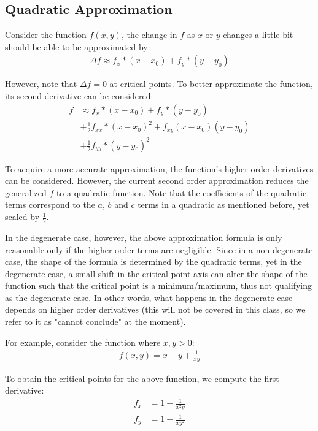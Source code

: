 \documentclass[12pt]{article}
\theoremstyle{definition}
\begin{document}
	\subsection{Quadratic Approximation}
	
	Consider the function $f(x, y)$, the change in $f$ as $x$ or $y$ changes a little bit should be able to be approximated by:
	\begin{gather*}
		\Delta f \approx f_x * (x - x_0) + f_y * (y - y_0)
	\end{gather*}
	
	However, note that $\Delta f = 0$ at critical points. To better approximate the function, its second derivative can be considered:
	\begin{align*}
		f &\approx f_x * (x - x_0) + f_y * (y - y_0) \\
		&+ \frac{1}{2} f_{xx} * (x - x_0)^2 + f_{xy} (x - x_0)(y - y_0) \\
		&+ \frac{1}{2} f_{yy} * (y - y_0)^2
	\end{align*}
	
	To acquire a more accurate approximation, the function's higher order derivatives can be considered. However, the current second order approximation reduces the generalized $f$ to a quadratic function. Note that the coefficients of the quadratic terms correspond to the $a$, $b$ and $c$ terms in a quadratic as mentioned before, yet scaled by $\frac{1}{2}$.
	
	In the degenerate case, however, the above approximation formula is only reasonable only if the higher order terms are negligible. Since in a non-degenerate case, the shape of the formula is determined by the quadratic terms, yet in the degenerate case, a small shift in the critical point axis can alter the shape of the function such that the critical point is a minimum/maximum, thus not qualifying as the degenerate case. In other words, what happens in the degenerate case depends on higher order derivatives (this will not be covered in this class, so we refer to it as "cannot conclude" at the moment).
	
	For example, consider the function where $x, y > 0$:
	\begin{gather*}
		f(x, y) = x + y + \frac{1}{xy}
	\end{gather*}
	
	To obtain the critical points for the above function, we compute the first derivative:
	\begin{align*}
		f_x &= 1 - \frac{1}{x^2y} \\
		f_y &= 1 - \frac{1}{xy^2}
	\end{align*}
	
\end{document}
